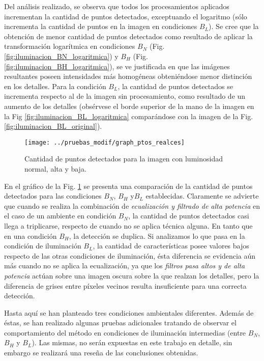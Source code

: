 Del análisis realizado, se observa que todos los procesamientos aplicados incrementan la cantidad de puntos detectados, exceptuando el logaritmo (sólo incrementa la cantidad de puntos en la imagen en condiciones $B_{L}$). Se cree que la obtención de menor cantidad de puntos detectados como resultado de aplicar la transformación logarítmica en condiciones $B_{N}$ (Fig. \ref{fig:iluminacion_BN_logaritmica}) y $B_{H}$ (Fig. \ref{fig:iluminacion_BH_logaritmica}), se ve justificada en que las imágenes resultantes poseen intensidades más homogéneas obteniéndose menor distinción en los detalles. Para la condición $B_{L}$, la cantidad de puntos detectados se incrementa respecto al de la imagen sin procesamiento, como resultado de un aumento de los detalles (obsérvese el borde superior de la mano de la imagen en la Fig \ref{fig:iluminacion_BL_logaritmica} comparándose con la imagen de la Fig. \ref{fig:iluminacion_BL_original}).
\begin{figure}[tbhp]
   \centering
        \texttt{[image: ../pruebas\_modif/graph\_ptos\_realces]}
    \caption[Cantidad de puntos detectados para la imagen con luminosidad normal, alta y baja]{Cantidad de puntos detectados para la imagen con luminosidad normal, alta y baja.}
   \label{graph:comparacion_cantptos}
\end{figure}

En el gráfico de la Fig. \ref{graph:comparacion_cantptos} se presenta una comparación de la cantidad de puntos detectados para las condiciones $B_{N}$, $B_{H}$ y$B_{L}$ establecidas. Claramente se advierte que cuando se realiza la combinación de \textit{ecualización y filtrado de alta potencia} en el caso de un ambiente en condición $B_{N}$, la cantidad de puntos detectados casi llega a triplicarse, respecto de cuando no se aplica técnica alguna. En tanto que en una condición $B_{H}$, la detección se duplica. Si analizamos lo que pasa en la condición de iluminación $B_{L}$, la cantidad de características posee valores bajos respecto de las otras condiciones de iluminación, ésta diferencia se evidencia aún más cuando no se aplica la ecualización, ya que los \textit{filtros pasa altos y de alta potencia} actúan sobre una imagen oscura sobre la que realzan los detalles, pero la diferencia de grises entre píxeles vecinos resulta insuficiente para una correcta detección.

Hasta aquí se han planteado tres condiciones ambientales diferentes. Además de éstas, se han realizado algunas pruebas adicionales tratando de observar el comportamiento del método en condiciones de iluminación intermedias (entre $B_{N}$, $B_{H}$ y $B_{L}$). Las mismas, no serán expuestas en este trabajo en detalle, sin embargo se realizará una reseña de las conclusiones obtenidas. 

